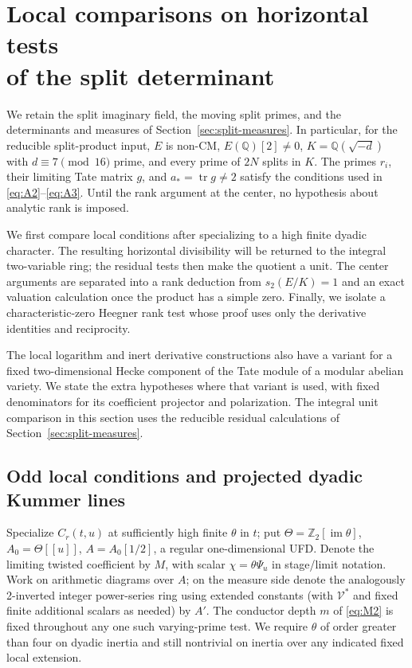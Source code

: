 \section[Local comparisons on horizontal tests of the split determinant]{Local comparisons on horizontal tests\\of the split determinant}\label{sec:split-local}

We retain the split imaginary field, the moving split primes, and the determinants and measures of Section~\ref{sec:split-measures}. In particular, for the reducible split-product input, \(E\) is non-CM, \(E(\mathbb Q)[2]\ne0\), \(K=\mathbb Q(\sqrt{-d})\) with \(d\equiv7\pmod {16}\) prime, and every prime of \(2N\) splits in \(K\). The primes \(r_i\), their limiting Tate matrix \(g\), and \(a_*=\operatorname{tr}g\ne2\) satisfy the conditions used in \eqref{eq:A2}--\eqref{eq:A3}. Until the rank argument at the center, no hypothesis about analytic rank is imposed.

We first compare local conditions after specializing to a high finite dyadic character. The resulting horizontal divisibility will be returned to the integral two-variable ring; the residual tests then make the quotient a unit. The center arguments are separated into a rank deduction from \(s_2(E/K)=1\) and an exact valuation calculation once the product has a simple zero. Finally, we isolate a characteristic-zero Heegner rank test whose proof uses only the derivative identities and reciprocity.

The local logarithm and inert derivative constructions also have a
variant for a fixed two-dimensional Hecke component of the Tate module
of a modular abelian variety.  We state the extra hypotheses where that
variant is used, with fixed denominators for its coefficient projector
and polarization.  The integral unit comparison in this section uses
the reducible residual calculations of Section~\ref{sec:split-measures}.

\subsection{Odd local conditions and projected dyadic Kummer lines}

Specialize \(C_r(t,u)\) at sufficiently high finite \(\theta\) in \(t\); put \(\Theta=\mathbb Z_2[\operatorname{im}\theta]\), \(A_0=\Theta[[u]]\), \(A=A_0[1/2]\), a regular one-dimensional UFD. Denote the limiting twisted coefficient by \(M\), with scalar \(\chi=\theta\Psi_u\) in stage/limit notation. Work on arithmetic diagrams over \(A\); on the measure side denote the analogously 2-inverted integer power-series ring using extended constants (with \(\mathcal V^*\) and fixed finite additional scalars as needed) by \(A'\). The conductor depth \(m\) of \eqref{eq:M2} is fixed throughout any one such varying-prime test. We require \(\theta\) of order greater than four on dyadic inertia and still nontrivial on inertia over any indicated fixed local extension.

